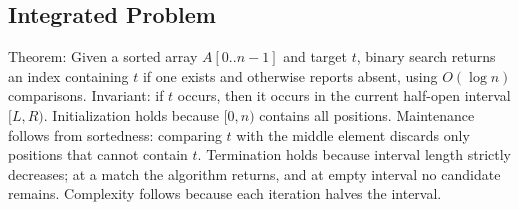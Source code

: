 \documentclass[11pt]{article}
\begin{document}
\subsection*{Integrated Problem}
Theorem: Given a sorted array $A[0..n-1]$ and target $t$, binary search returns an index containing $t$ if one exists and otherwise reports absent, using $O(\log n)$ comparisons. Invariant: if $t$ occurs, then it occurs in the current half-open interval $[L,R)$. Initialization holds because $[0,n)$ contains all positions. Maintenance follows from sortedness: comparing $t$ with the middle element discards only positions that cannot contain $t$. Termination holds because interval length strictly decreases; at a match the algorithm returns, and at empty interval no candidate remains. Complexity follows because each iteration halves the interval.
\end{document}
